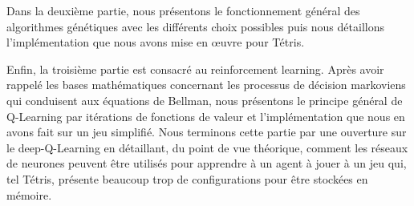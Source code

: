 Dans la deuxième partie, nous présentons le fonctionnement général des algorithmes génétiques avec les différents choix possibles puis nous détaillons l'implémentation que nous avons mise en {\oe}uvre pour Tétris. 

Enfin, la troisième partie est consacré au reinforcement learning. Après avoir rappelé les bases mathématiques concernant les processus de décision markoviens qui conduisent aux équations de Bellman, nous présentons le principe général de Q-Learning par itérations de fonctions de valeur et l'implémentation que nous en avons fait sur un jeu simplifié. Nous terminons cette partie par une ouverture sur le deep-Q-Learning en détaillant, du point de vue théorique, comment les réseaux de neurones peuvent être utilisés pour \og apprendre \fg{} à un agent à jouer à un jeu qui, tel Tétris, présente beaucoup trop de configurations pour être stockées en mémoire.

\bigskip





